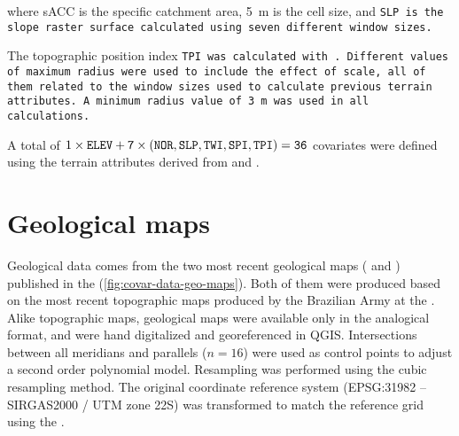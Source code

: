 \noindent where sACC is the specific catchment area, \SI{5}{\m} is the cell size, and \tt{SLP} is the slope 
raster surface calculated using seven different window sizes.

The topographic position index \tt{TPI} was calculated with . Different values of 
maximum radius were used to include the effect of scale, all of them related to the window sizes used to 
calculate previous terrain attributes. A minimum radius value of \SI{3}{\m} was used in all calculations.

A total of $1 \times \tt{ELEV} + 7 \times (\tt{NOR}, \tt{SLP}, \tt{TWI}, \tt{SPI}, \tt{TPI}) = 36$ covariates 
were defined using the terrain attributes derived from \demOld{} and \demNew{}.

\tocless\section{Geological maps}
\label{sec:covar-data-geo-maps}

Geological data comes from the two most recent geological maps (\geoOld{} and \geoNew{}) published in the 
 \cite{GasparettoEtAl1988, MacielFilho1990} (\autoref{fig:covar-data-geo-maps}). Both of 
them were produced based on the most recent topographic maps produced by the Brazilian Army at the 
 \cite{DSG1980, DSG1992, DSG1992a}. Alike topographic maps, geological maps were available 
only in the analogical format, and were hand digitalized and georeferenced in QGIS. Intersections between all 
meridians and parallels ($n = 16$) were used as control points to adjust a second order polynomial model. 
Resampling was performed using the cubic resampling method. The original coordinate reference system 
(EPSG:31982 -- SIRGAS2000 / UTM zone 22S) was transformed to match the reference grid using the 
 \cite{BivandEtAl2013a}.

